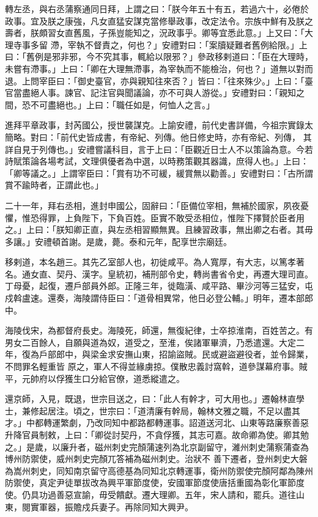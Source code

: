 \begin{pinyinscope}
 轉左丞，與右丞蒲察通同日拜，上謂之曰：「朕今年五十有五，若過六十，必倦於政事。宜及朕之康強，凡女直猛安謀克當修舉政事，改定法令。宗族中鮮有及朕之壽者，朕頗習女直舊風，子孫豈能知之，況政事乎。卿等宜悉此意。」上又曰：「大理寺事多留
 滯，宰執不督責之，何也？」安禮對曰：「案牘疑難者舊例給限。」上曰：「舊例是邪非邪，今不究其事，輒給以限邪？」參政移剌道曰：「臣在大理時，未嘗有滯事。」上曰：「卿在大理無滯事，為宰執而不能檢治，何也？」道無以對而退。上問宰臣曰：「御史臺官，亦與親知往來否？」皆曰：「往來殊少。」上曰：「臺官當盡絕人事。諫官、記注官與聞議論，亦不可與人游從。」安禮對曰：「親知之間，恐不可盡絕也。」上曰：「職任如是，何恤人之言。」



 進拜平章政事，封芮國公，授世襲謀克。上諭安禮，前代史書詳備，今祖宗實錄太簡略。對曰：「前代史皆成書，有帝紀、列傳。他日修史時，亦有帝紀、列傳，
 其詳自見于列傳也。」安禮嘗議科目，言于上曰：「臣觀近日士人不以策論為意。今若詩賦策論各場考試，文理俱優者為中選，以時務策觀其器識，庶得人也。」上曰：「卿等議之。」上謂宰臣曰：「賞有功不可緩，緩賞無以勸善。」安禮對曰：「古所謂賞不踰時者，正謂此也。」



 二十一年，拜右丞相，進封申國公，固辭曰：「臣備位宰相，無補於國家，夙夜憂懼，惟恐得罪，上負陛下，下負百姓。臣實不敢受丞相位，惟陛下擇賢於臣者用之。」上曰：「朕知卿正直，與左丞相習顯無異。且練習政事，無出卿之右者。其毋多讓。」安禮頓首謝。是歲，薨。泰和元年，配享世宗廟廷。



 移剌道，本名趙三。其先乙室部人也，初徙咸平。為人寬厚，有大志，以篤孝著名。通女直、契丹、漢字。皇統初，補刑部令史，轉尚書省令史，再遷大理司直。丁母憂，起復，遷戶部員外郎。正隆三年，徙臨潢、咸平路、畢沙河等三猛安，屯戍斡盧速。還奏，海陵謂侍臣曰：「道骨相異常，他日必登公輔。」明年，遷本部郎中。



 海陵伐宋，為都督府長史。海陵死，師還，無復紀律，士卒掠淮南，百姓苦之。有男女二百餘人，自願與道為奴，道受之，至淮，俟諸軍畢濟，乃悉遣還。大定二年，復為戶部郎中，與梁金求安撫山東，招諭盜賊。民或避盜避役者，並令歸業，不問罪名輕重皆
 原之，軍人不得並緣虜掠。僕散忠義討窩斡，道參謀幕府事。賊平，元帥府以俘獲生口分給官僚，道悉縱遣之。



 還京師，入見，既退，世宗目送之，曰：「此人有幹才，可大用也。」遷翰林直學士，兼修起居注。頃之，世宗曰：「道清廉有幹局，翰林文雅之職，不足以盡其才。」中都轉運繁劇，乃改同知中都路都轉運事。詔道送河北、山東等路廉察善惡升降官員制敕，上曰：「卿從討契丹，不貪俘獲，其志可嘉。故命卿為使。卿其勉之。」是歲，以廉升者，磁州刺史完顏蒲速列為北京副留守，濰州刺史蒲察蒲查為博州防禦使，威州刺史完顏兀答補為磁州刺史。治狀不
 善下遷者，登州刺史大磐為嵩州刺史，同知南京留守高德基為同知北京轉運事，衛州防禦使完顏阿鄰為陳州防禦使，真定尹徒單拔改為興平軍節度使，安國軍節度使唐括重國為彰化軍節度使。仍具功過善惡宣諭，毋受饋獻。遷大理卿。五年，宋人請和，罷兵。道往山東，閱實軍器，振贍戍兵妻子。再除同知大興尹。




\end{pinyinscope}

